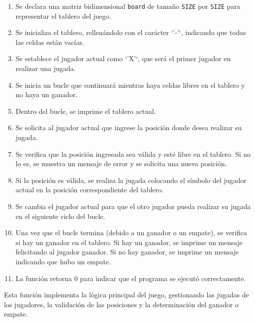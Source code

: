 \begin{enumerate}
    \item Se declara una matriz bidimensional \texttt{board} de tamaño \texttt{SIZE} por \texttt{SIZE} para representar el tablero del juego.
    \item Se inicializa el tablero, rellenándolo con el carácter `'-'`, indicando que todas las celdas están vacías.
    \item Se establece el jugador actual como `'X'`, que será el primer jugador en realizar una jugada.
    \item Se inicia un bucle que continuará mientras haya celdas libres en el tablero y no haya un ganador.
    \item Dentro del bucle, se imprime el tablero actual.
    \item Se solicita al jugador actual que ingrese la posición donde desea realizar su jugada.
    \item Se verifica que la posición ingresada sea válida y esté libre en el tablero. Si no lo es, se muestra un mensaje de error y se solicita una nueva posición.
    \item Si la posición es válida, se realiza la jugada colocando el símbolo del jugador actual en la posición correspondiente del tablero.
    \item Se cambia el jugador actual para que el otro jugador pueda realizar su jugada en el siguiente ciclo del bucle.
    \item Una vez que el bucle termina (debido a un ganador o un empate), se verifica si hay un ganador en el tablero. Si hay un ganador, se imprime un mensaje felicitando al jugador ganador. Si no hay ganador, se imprime un mensaje indicando que hubo un empate.
    \item La función retorna 0 para indicar que el programa se ejecutó correctamente.
\end{enumerate}

Esta función implementa la lógica principal del juego, gestionando las jugadas de los jugadores, la validación de las posiciones y la determinación del ganador o empate.
